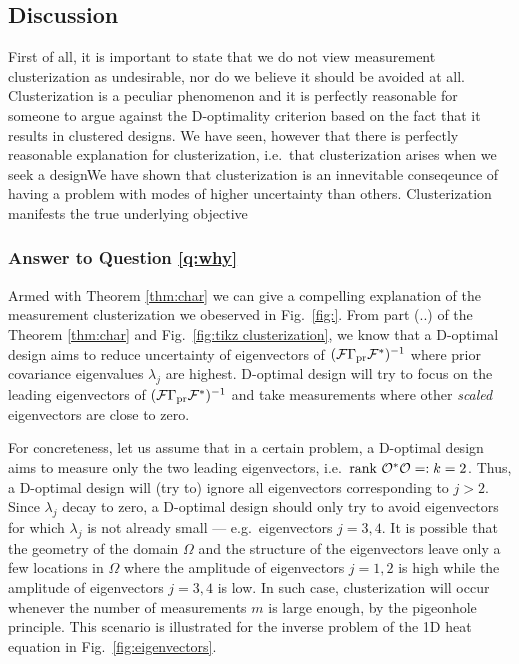 \subsection{Discussion}
First of all, it is important to state that we do not view measurement
clusterization as undesirable, nor do we believe it should be avoided
at all. Clusterization is a peculiar phenomenon and it is perfectly
reasonable for someone to argue against the D-optimality criterion
based on the fact that it results in clustered designs. We have seen,
however that there is perfectly reasonable explanation for
clusterization, i.e.~that clusterization arises when we seek a
designWe have shown that clusterization is an innevitable conseqeunce
of having a problem with modes of higher uncertainty than
others. Clusterization manifests the true underlying objective


\subsubsection{Answer to Question \ref{q:why}}
Armed with Theorem \ref{thm:char} we can give a compelling explanation
of the measurement clusterization we obeserved in
Fig.~\ref{fig:}. From part (..) of the Theorem \ref{thm:char} and
Fig.~\ref{fig:tikz clusterization}, we know that a D-optimal design
aims to reduce uncertainty of eigenvectors of
$(\mathcal{F}\Gamma_{\textup{pr}}\mathcal{F}^*)^{-1}$ where prior covariance eigenvalues
$\lambda_j$ are highest. D-optimal design will try to focus on the
leading eigenvectors of $(\mathcal{F}\Gamma_{\textup{pr}}\mathcal{F}^*)^{-1}$ and take
measurements where other \emph{scaled} eigenvectors are close to
zero.

For concreteness, let us assume that in a certain problem, a D-optimal
design aims to measure only the two leading eigenvectors, i.e.~$\textup{rank}\ 
\mathcal{O}^*\mathcal{O} =: k=2$. Thus, a D-optimal design will (try to) ignore all
eigenvectors corresponding to $j > 2$. Since $\lambda_j$ decay to
zero, a D-optimal design should only try to avoid eigenvectors for
which $\lambda_j$ is not already small --- e.g.~eigenvectors
$j=3,4$. It is possible that the geometry of the domain $\Omega$ and
the structure of the eigenvectors leave only a few locations in
$\Omega$ where the amplitude of eigenvectors $j=1,2$ is high while the
amplitude of eigenvectors $j=3,4$ is low. In such case, clusterization
will occur whenever the number of measurements $m$ is large enough, by
the pigeonhole principle. This scenario is illustrated for the inverse
problem of the 1D heat equation in Fig.~\ref{fig:eigenvectors}.

